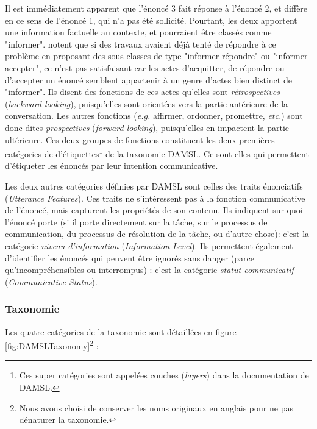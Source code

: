 \documentclass[10pt,a4paper,twoside]{article}
\begin{document}
Il est immédiatement apparent que l'énoncé 3 fait réponse à l'énoncé 2, et diffère en ce sens de l'énoncé 1, qui n'a pas été sollicité. Pourtant, les deux apportent une information factuelle au contexte, et pourraient être classés comme "informer". \citeauthor{core1997coding} notent que si des travaux avaient déjà tenté de répondre à ce problème en proposant des sous-classes de type "informer-répondre" ou "informer-accepter", ce n'est pas satisfaisant car les actes d'acquitter, de répondre ou d'accepter un énoncé semblent appartenir à un genre d'actes bien distinct de "informer". Ils disent des fonctions de ces actes qu'elles sont \textit{rétrospectives} (\textit{backward-looking}), puisqu'elles sont orientées vers la partie antérieure de la conversation. Les autres fonctions (\textit{e.g.} affirmer, ordonner, promettre, \textit{etc.}) sont donc dites \textit{prospectives} (\textit{forward-looking}), puisqu'elles en impactent la partie ultérieure. Ces deux groupes de fonctions constituent les deux premières catégories de d'étiquettes\footnote{Ces super catégories sont appelées \og couches \fg{} (\textit{layers}) dans la documentation de DAMSL.} de la taxonomie DAMSL. Ce sont elles qui permettent d'étiqueter les énoncés par leur intention communicative.

Les deux autres catégories définies par DAMSL sont celles des traits énonciatifs (\textit{Utterance Features}). Ces traits ne s'intéressent pas à la fonction communicative de l'énoncé, mais capturent les propriétés de son contenu. Ils indiquent sur quoi l'énoncé porte (si il porte directement sur la tâche, sur le processus de communication, du processus de résolution de la tâche, ou d'autre chose): c'est la catégorie \textit{niveau d'information} (\textit{Information Level}). Ils permettent également d'identifier les énoncés qui peuvent être ignorés sans danger (parce qu'incompréhensibles ou interrompus) : c'est la catégorie \textit{statut communicatif} (\textit{Communicative Status}).

\subsubsection{Taxonomie}

Les quatre catégories de la taxonomie sont détaillées en figure \ref{fig:DAMSLTaxonomy}\footnote{Nous avons choisi de conserver les noms originaux en anglais pour ne pas dénaturer la taxonomie.} :
\end{document}
